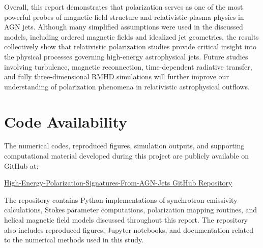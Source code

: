 \documentclass{article}
\begin{document}
Overall, this report demonstrates that polarization serves as one of the most powerful probes of magnetic field structure and relativistic plasma physics in AGN jets. Although many simplified assumptions were used in the discussed models, including ordered magnetic fields and idealized jet geometries, the results collectively show that relativistic polarization studies provide critical insight into the physical processes governing high-energy astrophysical jets. Future studies involving turbulence, magnetic reconnection, time-dependent radiative transfer, and fully three-dimensional RMHD simulations will further improve our understanding of polarization phenomena in relativistic astrophysical outflows.

\section{Code Availability}

The numerical codes, reproduced figures, simulation outputs, and supporting computational material developed during this project are publicly available on GitHub at:

\begin{center}
\href{https://github.com/Dhanad1905/High-Energy-Polarization-Signatures-From-AGN-Jets#high-energy-polarization-signatures-from-agn-jets}{High-Energy-Polarization-Signatures-From-AGN-Jets GitHub Repository}
\end{center}

The repository contains Python implementations of synchrotron emissivity calculations, Stokes parameter computations, polarization mapping routines, and helical magnetic field models discussed throughout this report. The repository also includes reproduced figures, Jupyter notebooks, and documentation related to the numerical methods used in this study.

\newpage
\end{document}
